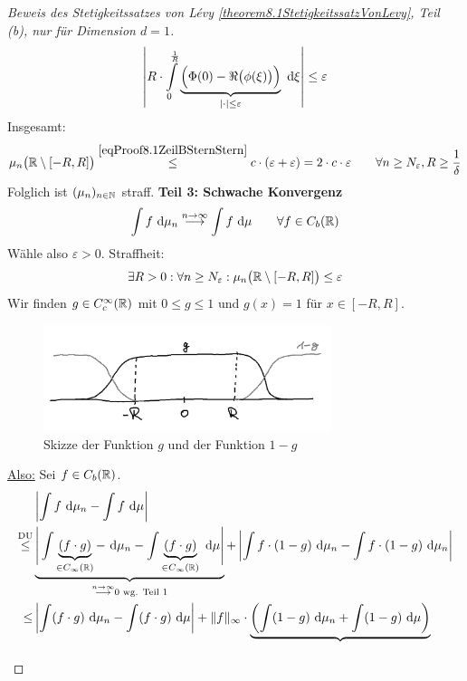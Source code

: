 \begin{proof}[Beweis des Stetigkeitssatzes von Lévy \ref{theorem8.1StetigkeitssatzVonLevy}, Teil (b), nur für Dimension $d=1$]
\begin{align*}
		\left|R\cdot\int\limits_0^{\frac{1}{R}}\underbrace{\Big(\Phi(0)-\Re\big(\phi(\xi)\big)\Big)}_{|\cdot|\leq\varepsilon}\text{ d}\xi\right|\leq\varepsilon
	\end{align*}
	Insgesamt:
	\begin{align*}
		\mu_n\big(\mathbb{R}\setminus[-R,R]\big)
		\overset{\eqref{eqProof8.1ZeilBSternStern}}{\leq}
		c\cdot(\varepsilon+\varepsilon)
		=2\cdot c\cdot\varepsilon
		\qquad\forall n\geq N_\varepsilon,R\geq\frac{1}{\delta}
	\end{align*}
	Folglich ist $(\mu_n)_{n\in\mathbb{N}}$ straff.\nl
	\textbf{Teil 3: Schwache Konvergenz}
	\begin{align*}
		\int\limits f\text{ d}\mu_n\overset{n\to\infty}{\longrightarrow}\int\limits f\text{ d}\mu\qquad\forall f\in C_b(\mathbb{R})
	\end{align*}
	Wähle also $\varepsilon>0$. Straffheit:
	\begin{align*}
		\exists R>0:\forall n\geq N_\varepsilon:\mu_n\big(\mathbb{R}\setminus[-R,R]\big)\leq\varepsilon
	\end{align*}
	Wir finden $g\in C_c^\infty(\mathbb{R})$ mit $0\leq g\leq 1$ und $g(x)=1$ für $x\in[-R,R]$.
	\begin{figure}[ht!]
		\begin{center}
			\includegraphics[width=0.75\textwidth]{./pics/Sketch7.png}
			\caption{Skizze der Funktion $g$ und der Funktion $1-g$}
			\label{AbbSkizzeEinsFunktion}
		\end{center}
	\end{figure}
	\underline{Also:} Sei $f\in C_b(\mathbb{R})$.
	\begin{align*}
		&\left|\int\limits f\text{ d}\mu_n-\int\limits f\text{ d}\mu\right|\\
		\overset{\text{DU}}{\leq}&
		\underbrace{\Bigg|\int\limits \underbrace{(f\cdot g)}_{\in C_\infty(\mathbb{R})}-\text{ d}\mu_n-\int\limits\underbrace{(f\cdot g)}_{\in C_\infty(\mathbb{R})}\text{ d}\mu\Bigg|}_{\overset{n\to\infty}{\longrightarrow}0\text{ wg. Teil 1}}
		+\left|\int\limits f\cdot(1-g)\text{ d}\mu_n-\int\limits f\cdot(1- g)\text{ d}\mu_n\right|\\
		\leq&\left|\int\limits (f\cdot g)\text{ d}\mu_n-\int\limits(f\cdot g)\text{ d}\mu\right|
		+\Vert f\Vert_\infty\cdot\underbrace{\left(\int\limits(1-g)\text{ d}\mu_n+\int\limits(1-g)\text{ d}\mu\right)}_{
}
\end{align*}
\end{proof}
